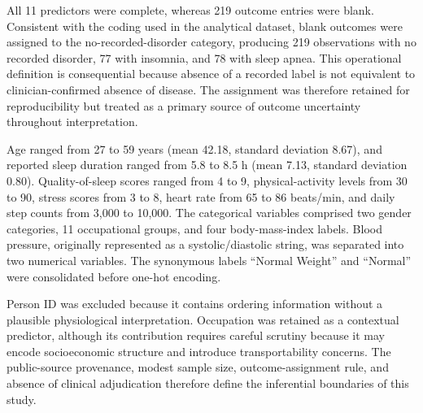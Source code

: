 ﻿\documentclass[preprint,12pt]{elsarticle}
\begin{document}
All 11 predictors were complete, whereas 219 outcome entries were blank. Consistent with the coding used in the analytical dataset, blank outcomes were assigned to the no-recorded-disorder category, producing 219 observations with no recorded disorder, 77 with insomnia, and 78 with sleep apnea. This operational definition is consequential because absence of a recorded label is not equivalent to clinician-confirmed absence of disease. The assignment was therefore retained for reproducibility but treated as a primary source of outcome uncertainty throughout interpretation.

Age ranged from 27 to 59 years (mean 42.18, standard deviation 8.67), and reported sleep duration ranged from 5.8 to 8.5 h (mean 7.13, standard deviation 0.80). Quality-of-sleep scores ranged from 4 to 9, physical-activity levels from 30 to 90, stress scores from 3 to 8, heart rate from 65 to 86 beats/min, and daily step counts from 3,000 to 10,000. The categorical variables comprised two gender categories, 11 occupational groups, and four body-mass-index labels. Blood pressure, originally represented as a systolic/diastolic string, was separated into two numerical variables. The synonymous labels ``Normal Weight'' and ``Normal'' were consolidated before one-hot encoding.

Person ID was excluded because it contains ordering information without a plausible physiological interpretation. Occupation was retained as a contextual predictor, although its contribution requires careful scrutiny because it may encode socioeconomic structure and introduce transportability concerns. The public-source provenance, modest sample size, outcome-assignment rule, and absence of clinical adjudication therefore define the inferential boundaries of this study.
\end{document}
